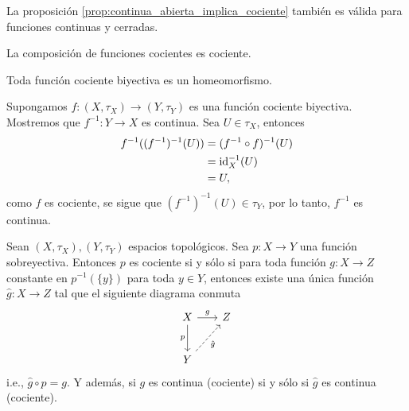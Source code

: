 \begin{obs}
    La proposición \ref{prop:continua_abierta_implica_cociente} también es válida para funciones continuas y cerradas.
\end{obs}
\begin{obs}
\label{obs:composicion_cociente}
    La composición de funciones cocientes es cociente.
\end{obs}
\begin{prop}
\label{prop:cociente_biyectiva_implica_homeomorfismo}
    Toda función cociente biyectiva es un homeomorfismo.
\end{prop}
\begin{dem}
    Supongamos $f:(X,\tau_X)\to (Y,\tau_Y)$ es una función cociente biyectiva. Mostremos que $f^{-1}:Y\to X$ es continua. Sea $U\in\tau_X$, entonces
    \begin{align*}
        f^{-1}((f^{-1})^{-1}(U))&=(f^{-1}\circ f)^{-1}(U)\\
        &=\mathrm{id}_X^{-1}(U)\\
        &=U,
    \end{align*}
    como $f$ es cociente, se sigue que $(f^{-1})^{-1}(U)\in\tau_Y$, por lo tanto, $f^{-1}$ es continua.
\end{dem}
\begin{coro}
    \label{prop:propiedad_universal_cociente}
    Sean $(X,\tau_X), (Y,\tau_Y)$ espacios topológicos. Sea $p:X\to Y$ una función sobreyectiva. Entonces $p$ es cociente si y sólo si para toda función $g:X\to Z$ constante en $p^{-1}(\{y\})$ para toda $y\in Y$, entonces existe una única función $\hat{g}:X\to Z$ tal que el siguiente diagrama conmuta
    \[
    \begin{tikzcd}[column sep=0.65cm, row sep=0.85cm] 
        X\arrow[r,"g"] \arrow[d,"p"'] & Z\\
        Y \arrow[ur, dashed, "\hat{g}"']
    \end{tikzcd}
    \]
    i.e., $\hat{g}\circ p=g$. Y además, si $g$ es continua (cociente) si y sólo si $\hat{g}$ es continua (cociente).
\end{coro}
